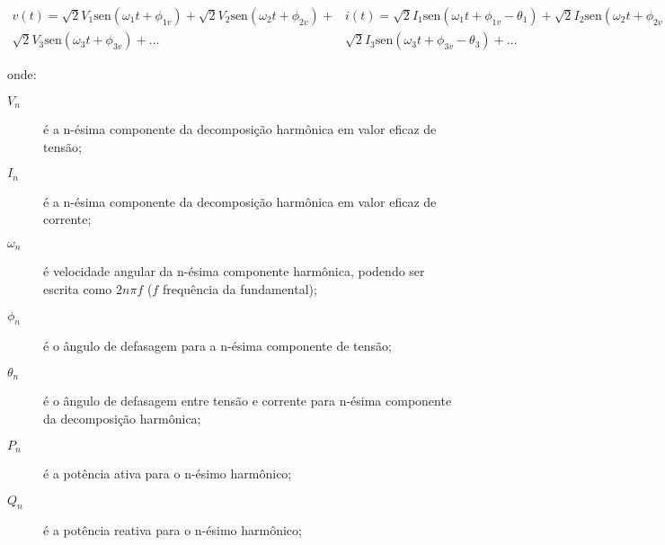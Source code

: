 \begin{subequations} \label{eq:ipqds}
\begin{eqnarray}\label{eq:v}
v(t) = \sqrt{2}V_1 \text{sen}(\omega_1 t + \phi_{1v}) +
\sqrt{2}V_2 \text{sen}(\omega_2 t + \phi_{2v}) +  \nonumber \\
\sqrt{2}V_3 \text{sen}(\omega_3 t + \phi_{3v}) + \dots
\end{eqnarray}
\begin{eqnarray}\label{eq:i}
i(t)=\sqrt{2}I_1 \text{sen}(\omega_1 t + \phi_{1v} - \theta_{1}) +
\sqrt{2}I_2 \text{sen}(\omega_2 t + \phi_{2v} - \theta_{2}) +
\nonumber \\
\sqrt{2}I_3 \text{sen}(\omega_3 t + \phi_{3v} - \theta_{3}) + \dots
\end{eqnarray}
\begin{equation}\label{eq:pn}
P_n=V_nI_n\cos{\theta_n} ~~,~~ P=\sum_{n=1}^{\infty}P_n
\end{equation}
\begin{equation}\label{eq:q}
Q_n=V_nI_n\text{sen}{\theta_n} ~~,~~ Q=\sum_{n=1}^{\infty}Q_n
\end{equation}
\begin{equation}\label{eq:s}
S=VI
\end{equation}
\begin{equation}\label{eq:d}
D^2=S^2-P^2-Q^2
\end{equation}
\end{subequations}

\noindent onde:

\begin{description}
\item[$V_n$] é a n-ésima componente da decomposição harmônica em valor
eficaz de tensão;
\item[$I_n$] é a n-ésima componente da decomposição harmônica em valor
eficaz de corrente; 
\item[$\omega_n$] é velocidade angular da n-ésima componente
harmônica, podendo ser escrita como $2n\pi f$ ($f$ frequência da
fundamental);
\item[$\phi_n$] é o ângulo de defasagem para a n-ésima componente de
tensão;
\item[$\theta_n$] é o ângulo de defasagem entre tensão e corrente para 
n-ésima componente da decomposição harmônica;
\item[$P_n$] é a potência ativa para o n-ésimo harmônico;
\item[$Q_n$] é a potência reativa para o n-ésimo harmônico;
\end{description}

